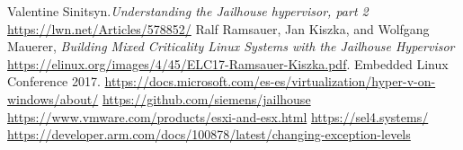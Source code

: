 \documentclass[spanish,12pt,a4paper,oneside]{book}
\begin{document}
\begin{thebibliography}{00}
   Valentine Sinitsyn.\emph{Understanding the Jailhouse hypervisor, part 2} \url{https://lwn.net/Articles/578852/}
   Ralf Ramsauer, Jan Kiszka, and Wolfgang Mauerer, \emph{Building Mixed Criticality Linux Systems with the Jailhouse Hypervisor} \url{https://elinux.org/images/4/45/ELC17-Ramsauer-Kiszka.pdf}. Embedded Linux Conference 2017.
	 \url{https://docs.microsoft.com/es-es/virtualization/hyper-v-on-windows/about/}
	 \url{https://github.com/siemens/jailhouse}
	 \url{https://www.vmware.com/products/esxi-and-esx.html}
	 \url{https://sel4.systems/}
	 \url{https://developer.arm.com/docs/100878/latest/changing-exception-levels}

\end{thebibliography}
\end{document}
